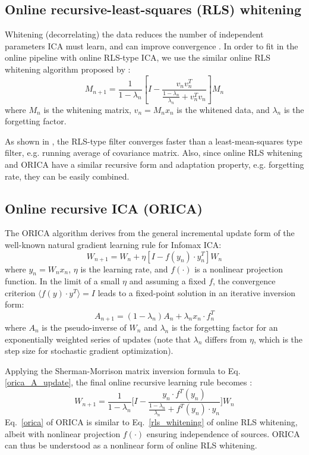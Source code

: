 \documentclass[letterpaper, 10 pt, conference]{ieeeconf}  %
\begin{document}
\subsection{Online recursive-least-squares (RLS) whitening}
Whitening (decorrelating) the data reduces the number of independent parameters ICA must learn, and can improve convergence \cite{AapoICABook}. In order to fit in the online pipeline with online RLS-type ICA, we use the similar online RLS whitening algorithm proposed by \cite{zhu2004natural}:
\begin{equation} \label{rls_whitening}
M_{n+1}=\frac{1}{1-\lambda_n}[I-\frac{v_n v^T_n}{\frac{1-\lambda_n}{\lambda_n} + v_n^T v_n}]M_n
\end{equation}
where $M_n$ is the whitening matrix, $v_n = M_n x_n$ is the whitened data, and $\lambda_n$ is the forgetting factor.  

As shown in \cite{zhu2004natural}, the RLS-type filter converges faster than a least-mean-squares type filter, e.g. running average of covariance matrix. Also, since online RLS whitening and ORICA have a similar recursive form and adaptation property, e.g. forgetting rate, they can be easily combined.

\subsection{Online recursive ICA (ORICA)}
The ORICA algorithm derives from the general incremental update form of the well-known natural gradient learning rule for Infomax ICA:
\[W_{n+1}=W_n+\eta [I-f(y_n)\cdot y^T_n]W_n \]
where $y_n=W_n x_n$, $\eta$ is the learning rate, and $f(\cdot)$ is a nonlinear projection function. In the limit of a small $\eta$ and assuming a fixed $f$, the convergence criterion $\langle f(y)\cdot y^T\rangle=I$ leads to a fixed-point solution in an iterative inversion form:
\begin{equation} \label{orica_A_update}
A_{n+1}=(1-\lambda_n)A_n+\lambda_n x_n\cdot f^T_n
\end{equation}
where $A_n$ is the pseudo-inverse of $W_n$ and $\lambda_n$ is the forgetting factor for an exponentially weighted series of updates (note that $\lambda_n$ differs from $\eta$, which is the step size for stochastic gradient optimization).

Applying the Sherman-Morrison matrix inversion formula to Eq. \ref{orica_A_update}, the final online recursive learning rule becomes \cite{akhtar2012recursive}:
\begin{equation} \label{orica}
W_{n+1}=\frac{1}{1-\lambda_n}\Big[ I-\frac{y_n \cdot f^T(y_n)}{\frac{1-\lambda_n}{\lambda_n} + f^T(y_n)\cdot y_n}\Big] W_n
\end{equation}
Eq.~\ref{orica} of ORICA is similar to Eq.~\ref{rls_whitening} of online RLS whitening, albeit with nonlinear projection $f(\cdot)$ ensuring independence of sources. %
ORICA can thus be understood as a nonlinear form of online RLS whitening. 
\end{document}
